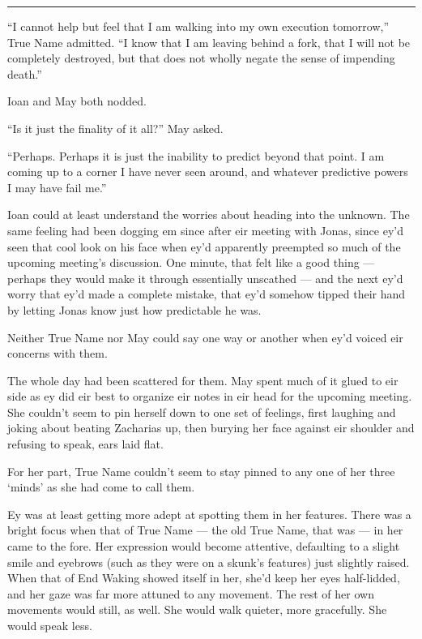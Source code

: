 \begin{center}\rule{0.5\linewidth}{0.5pt}\end{center}

``I cannot help but feel that I am walking into my own execution tomorrow,'' True Name admitted. ``I know that I am leaving behind a fork, that I will not be completely destroyed, but that does not wholly negate the sense of impending death.''

Ioan and May both nodded.

``Is it just the finality of it all?'' May asked.

``Perhaps. Perhaps it is just the inability to predict beyond that point. I am coming up to a corner I have never seen around, and whatever predictive powers I may have fail me.''

Ioan could at least understand the worries about heading into the unknown. The same feeling had been dogging em since after eir meeting with Jonas, since ey'd seen that cool look on his face when ey'd apparently preempted so much of the upcoming meeting's discussion. One minute, that felt like a good thing — perhaps they would make it through essentially unscathed — and the next ey'd worry that ey'd made a complete mistake, that ey'd somehow tipped their hand by letting Jonas know just how predictable he was.

Neither True Name nor May could say one way or another when ey'd voiced eir concerns with them.

The whole day had been scattered for them. May spent much of it glued to eir side as ey did eir best to organize eir notes in eir head for the upcoming meeting. She couldn't seem to pin herself down to one set of feelings, first laughing and joking about beating Zacharias up, then burying her face against eir shoulder and refusing to speak, ears laid flat.

For her part, True Name couldn't seem to stay pinned to any one of her three `minds' as she had come to call them.

Ey was at least getting more adept at spotting them in her features. There was a bright focus when that of True Name — the old True Name, that was — in her came to the fore. Her expression would become attentive, defaulting to a slight smile and eyebrows (such as they were on a skunk's features) just slightly raised. When that of End Waking showed itself in her, she'd keep her eyes half-lidded, and her gaze was far more attuned to any movement. The rest of her own movements would still, as well. She would walk quieter, more gracefully. She would speak less.

